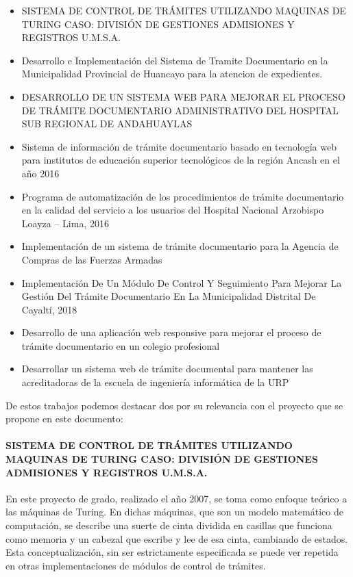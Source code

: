 \begin{itemize}
    \item SISTEMA DE CONTROL DE TRÁMITES UTILIZANDO MAQUINAS DE TURING CASO: DIVISIÓN DE GESTIONES ADMISIONES Y REGISTROS U.M.S.A.
    \item Desarrollo e Implementación del Sistema de Tramite
          Documentario en la Municipalidad Provincial de
          Huancayo para la atencion de expedientes.
    \item DESARROLLO DE UN SISTEMA WEB PARA MEJORAR  EL PROCESO DE TRÁMITE DOCUMENTARIO ADMINISTRATIVO DEL HOSPITAL SUB REGIONAL DE  ANDAHUAYLAS
    \item Sistema de información de trámite documentario basado en tecnología web para institutos de educación superior tecnológicos de la región Ancash en el año 2016
    \item Programa de automatización de los procedimientos de trámite documentario en la calidad del servicio a los usuarios del Hospital Nacional Arzobispo Loayza – Lima, 2016
    \item Implementación de un sistema de trámite documentario para la Agencia de Compras de las Fuerzas Armadas
    \item Implementación De Un Módulo De Control Y Seguimiento Para Mejorar La Gestión Del Trámite Documentario En La Municipalidad Distrital De Cayaltí, 2018
    \item Desarrollo de una aplicación web responsive para mejorar el proceso de trámite documentario en un colegio profesional
    \item Desarrollar un sistema web de trámite documental para mantener las acreditadoras de la escuela de ingeniería informática de la URP
\end{itemize}

De estos trabajos podemos destacar dos por su relevancia con el proyecto que se propone en este documento:

\paragraph{SISTEMA DE CONTROL DE TRÁMITES UTILIZANDO MAQUINAS DE TURING CASO: DIVISIÓN DE GESTIONES ADMISIONES Y REGISTROS U.M.S.A.}

En este proyecto de grado, realizado el año 2007, se toma como enfoque teórico a las máquinas de Turing. En dichas máquinas, que son un modelo matemático de computación, se describe una suerte de cinta dividida en casillas que funciona como memoria y un cabezal que escribe y lee de esa cinta, cambiando de estados. Esta conceptualización, sin ser estrictamente especificada se puede ver repetida en otras implementaciones de módulos de control de trámites.

